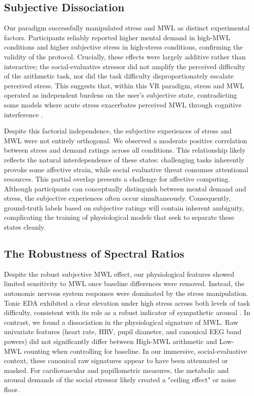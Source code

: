 \documentclass[lettersize,journal]{IEEEtran}
\begin{document}
 


\subsection{Subjective Dissociation}

Our paradigm successfully manipulated stress and MWL as distinct experimental factors. Participants reliably reported higher mental demand in high-MWL conditions and higher subjective stress in high-stress conditions, confirming the validity of the protocol. Crucially, these effects were largely additive rather than interactive; the social-evaluative stressor did not amplify the perceived difficulty of the arithmetic task, nor did the task difficulty disproportionately escalate perceived stress. This suggests that, within this VR paradigm, stress and MWL operated as independent burdens on the user's subjective state, contradicting some models where acute stress exacerbates perceived MWL through cognitive interference \cite{matthewsDynamicRelationshipsStress2010, shieldsEffectsAcuteStress2016}.

Despite this factorial independence, the subjective experiences of stress and MWL were not entirely orthogonal. We observed a moderate positive correlation between stress and demand ratings across all conditions. This relationship likely reflects the natural interdependence of these states: challenging tasks inherently provoke some affective strain, while social evaluative threat consumes attentional resources. This partial overlap presents a challenge for affective computing. Although participants can conceptually distinguish between mental demand and stress, the subjective experiences often occur simultaneously. Consequently, ground-truth labels based on subjective ratings will contain inherent ambiguity, complicating the training of physiological models that seek to separate these states cleanly.

\subsection{The Robustness of Spectral Ratios}

Despite the robust subjective MWL effect, our physiological features showed limited sensitivity to MWL once baseline differences were removed. Instead, the autonomic nervous system responses were dominated by the stress manipulation. Tonic EDA exhibited a clear elevation under high stress across both levels of task difficulty, consistent with its role as a robust indicator of sympathetic arousal \cite{faircloughFundamentalsPhysiologicalComputing2009, masiStressWorkloadAssessment2023}. In contrast, we found a dissociation in the physiological signature of MWL. Raw univariate features (heart rate, HRV, pupil diameter, and canonical EEG band powers) did not significantly differ between High-MWL arithmetic and Low-MWL counting when controlling for baseline. In our immersive, social-evaluative context, these canonical raw signatures appear to have been attenuated or masked. For cardiovascular and pupillometric measures, the metabolic and arousal demands of the social stressor likely created a "ceiling effect" or noise floor. 
\end{document}
